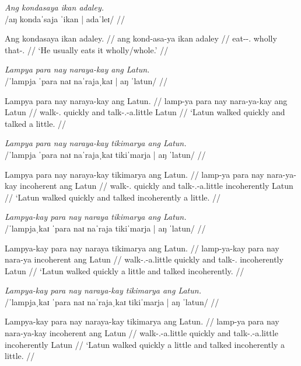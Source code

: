 \documentclass[12pt,a4paper]{scrartcl}
\newcommand{\PargI}{{\Parg}.{\Inan}}
\newcommand{\TsgM}{{\Tsg}.{\M}}
\begin{document}
\ex\begingl
\glpreamble \textit{Ang kondasaya ikan adaley.}\footnotemark \\
	/aŋ kondaˈsaja ˈikan | adaˈleɪ/ //

\gla Ang kondasaya ikan adaley. //
\glb ang kond-asa-ya ikan adaley //
\glc \AgtT{} eat-\Hab{}-\TsgM{} wholly that-\PargI{} //
\glft `He usually eats it wholly/whole.' //
\endgl\xe


\ex\begingl
\glpreamble \textit{Lampya para nay naraya-kay ang Latun.} \\
	/ˈlampja ˈpara naɪ naˈrajaˌkaɪ | aŋ ˈlatun/ //

\gla Lampya para nay naraya-kay ang Latun. //
\glb lamp-ya para nay nara-ya-kay ang Latun //
\glc walk-\TsgM{} quickly and talk-\TsgM{}-a.little \Aarg{} Latun //
\glft `Latun walked quickly and talked a little. //
\endgl\xe

\ex\begingl
\glpreamble \textit{Lampya para nay naraya-kay tikimarya ang Latun.} \\
	/ˈlampja ˈpara naɪ naˈrajaˌkaɪ tikiˈmarja | aŋ ˈlatun/ //

\gla Lampya para nay naraya-kay tikimarya ang Latun. //
\glb lamp-ya para nay nara-ya-kay incoherent ang Latun //
\glc walk-\TsgM{} quickly and talk-\TsgM{}-a.little incoherently \Aarg{} Latun //
\glft `Latun walked quickly and talked incoherently a little. //
\endgl\xe

\ex\begingl
\glpreamble \textit{Lampya-kay para nay naraya tikimarya ang Latun.} \\
	/ˈlampjaˌkaɪ ˈpara naɪ naˈraja tikiˈmarja | aŋ ˈlatun/ //

\gla Lampya-kay para nay naraya tikimarya ang Latun. //
\glb lamp-ya-kay para nay nara-ya incoherent ang Latun //
\glc walk-\TsgM{}-a.little quickly and talk-\TsgM{} incoherently \Aarg{} Latun //
\glft `Latun walked quickly a little and talked incoherently. //
\endgl\xe

\ex\begingl
\glpreamble \textit{Lampya-kay para nay naraya-kay tikimarya ang Latun.} \\
	/ˈlampjaˌkaɪ ˈpara naɪ naˈrajaˌkaɪ tikiˈmarja | aŋ ˈlatun/ //

\gla Lampya-kay para nay naraya-kay tikimarya ang Latun. //
\glb lamp-ya para nay nara-ya-kay incoherent ang Latun //
\glc walk-\TsgM{}-a.little quickly and talk-\TsgM{}-a.little incoherently \Aarg{} Latun //
\glft `Latun walked quickly a little and talked incoherently a little. //
\endgl\xe
\end{document}
